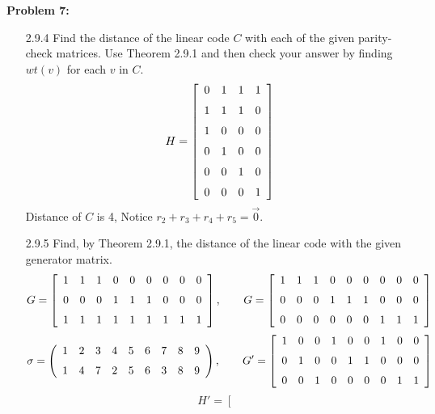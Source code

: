 \documentclass[11pt]{article}
\newenvironment{problem}[1]{\textbf{Problem #1: }}{\newpage}
\begin{document}
	\begin{problem}{7}
		 \begin{itemize}
		 	\item[2.9.4] 
		 	Find the distance of the linear code $C$ with each of the given parity-check matrices. Use Theorem 2.9.1 and then check your answer by finding $wt(v)$ for each $v$ in $C$.
		 	\[H = \left[\begin{array}{cccc}
		 		0&1&1&1 \\
		 		\noalign{\medskip} 1&1&1&0 \\
		 		\noalign{\medskip} 1&0&0&0 \\
		 		\noalign{\medskip} 0&1&0&0 \\
		 		\noalign{\medskip} 0&0&1&0 \\
		 		\noalign{\medskip} 0&0&0&1 \\
		 	\end{array}\right]\]
	 		Distance of $C$ is 4, Notice $r_2 + r_3 + r_4 + r_5 = \vec{0}$.
	 		\item[2.9.5] Find, by Theorem 2.9.1, the distance of the linear code with the given generator matrix.
	 		\[G = \left[\begin{array}{ccccccccc}
	 			1&1&1&0&0&0&0&0&0 \\
	 			\noalign{\medskip} 0&0&0&1&1&1&0&0&0 \\
	 			\noalign{\medskip} 1&1&1&1&1&1&1&1&1 \\
	 		\end{array}\right], \qquad G = \left[\begin{array}{ccccccccc}
	 		1&1&1&0&0&0&0&0&0 \\
	 		\noalign{\medskip} 0&0&0&1&1&1&0&0&0 \\
	 		\noalign{\medskip} 0&0&0&0&0&0&1&1&1 \\
 		\end{array}\right] \]
 		\[\sigma = \left(\begin{array}{ccccccccc}
 			1&2&3&4&5&6&7&8&9 \\
 			\noalign{\medskip} 1&4&7&2&5&6&3&8&9
 		\end{array}\right), \qquad G' = \left[\begin{array}{ccccccccc}
 		1&0&0&1&0&0&1&0&0 \\
 		\noalign{\medskip} 0&1&0&0&1&1&0&0&0 \\
 		\noalign{\medskip} 0&0&1&0&0&0&0&1&1 \\
 		\end{array}\right]\]
 		\[H' = \left[\begin{array}{cccccc}

\end{array}\]
\end{itemize}
\end{problem}
\end{document}
